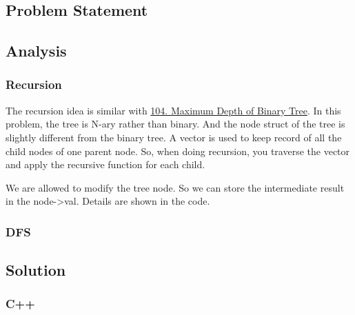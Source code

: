 \documentclass[12pt]{article}
\begin{document}
\subsection{Problem Statement}
\label{sec:orgcd55aba}
\subsection{Analysis}
\label{sec:orgb68c172}
\subsubsection{Recursion}
\label{sec:org319aa5e}
The recursion idea is similar with \hyperref[org09d5ac3]{104. Maximum Depth of Binary Tree}. In this problem, the tree is N-ary rather than binary. And the node struct of the tree is slightly different from the binary tree. A vector is used to keep record of all the child nodes of one parent node. So, when doing recursion, you traverse the vector and apply the recursive function for each child.

We are allowed to modify the tree node. So we can store the intermediate result in the node->val. Details are shown in the code.
\subsubsection{DFS}
\label{sec:org5640f3b}

\subsection{Solution}
\label{sec:orge133587}
\subsubsection{C++}
\label{sec:orged964c5}
\end{document}
